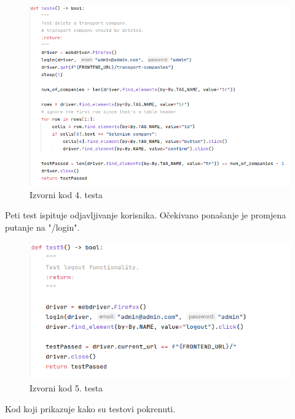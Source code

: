 			\begin{figure}[H]
				\includegraphics[width=\textwidth]{slike/selenium_test4.png}
				\centering
				\caption{Izvorni kod 4. testa}
				\label{fig:izvorni-kod-testa-4}
			\end{figure}
		
			Peti test ispituje odjavljivanje korisnika. Očekivano ponašanje je promjena putanje na "/login".
			
			\begin{figure}[H]
				\includegraphics[width=\textwidth]{slike/selenium_test5.png}
				\centering
				\caption{Izvorni kod 5. testa}
				\label{fig:izvorni-kod-testa-5}
			\end{figure}
		
			Kod koji prikazuje kako su testovi pokrenuti.
			
